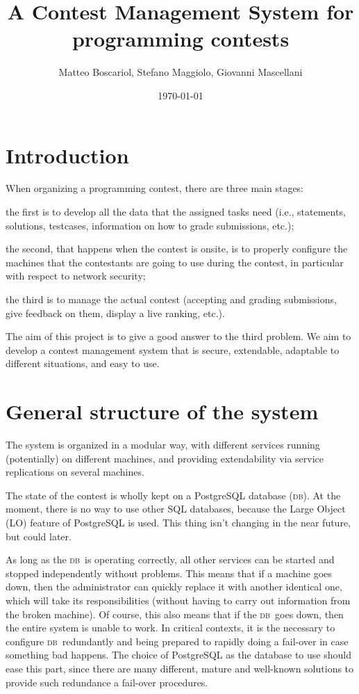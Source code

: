\documentclass[a4paper,8pt]{amsart}
\title{A Contest Management System for programming contests}
\author{Matteo Boscariol, Stefano Maggiolo, Giovanni Mascellani}
\date{\today}
\newcommand{\DB}{\textsc{db}}
\newenvironment{squishlist}{%
  \begin{list}{\textbullet}%
    { \setlength{\itemsep}{0pt}%
      \setlength{\parsep}{3pt}%
      \setlength{\topsep}{3pt}%
      \setlength{\partopsep}{0pt}%
      \setlength{\leftmargin}{1.5em}%
      \setlength{\labelwidth}{1em}%
      \setlength{\labelsep}{0.5em} }%
}{\end{list}}
\begin{document}
\maketitle
\tableofcontents

\begin{multicols}{2}

  \section{Introduction}

  When organizing a programming contest, there are three main stages:
  \begin{squishlist}
  \item the first is to develop all the data that the assigned tasks
    need (i.e., statements, solutions, testcases, information on how
    to grade submissions, etc.);
  \item the second, that happens when the contest is onsite, is to
    properly configure the machines that the contestants are going to
    use during the contest, in particular with respect to network
    security;
  \item the third is to manage the actual contest (accepting and
    grading submissions, give feedback on them, display a live
    ranking, etc.).
  \end{squishlist}

  The aim of this project is to give a good answer to the third
  problem. We aim to develop a contest management system that is
  secure, extendable, adaptable to different situations, and easy to
  use.

  \section{General structure of the system}

  The system is organized in a modular way, with different services
  running (potentially) on different machines, and providing
  extendability via service replications on several machines.

  The state of the contest is wholly kept on a PostgreSQL database
  (\DB). At the moment, there is no way to use other SQL databases,
  because the Large Object (LO) feature of PostgreSQL is used. This
  thing isn't changing in the near future, but could later.

  As long as the \DB\ is operating correctly, all other services can
  be started and stopped independently without problems. This means
  that if a machine goes down, then the administrator can quickly
  replace it with another identical one, which will take its
  responsibilities (without having to carry out information from the
  broken machine). Of course, this also means that if the \DB\ goes
  down, then the entire system is unable to work. In critical
  contexts, it is the necessary to configure \DB\ redundantly and
  being prepared to rapidly doing a fail-over in case something bad
  happens. The choice of PostgreSQL as the database to use should ease
  this part, since there are many different, mature and well-known
  solutions to provide such redundance a fail-over procedures.


\end{multicols}
\end{document}
